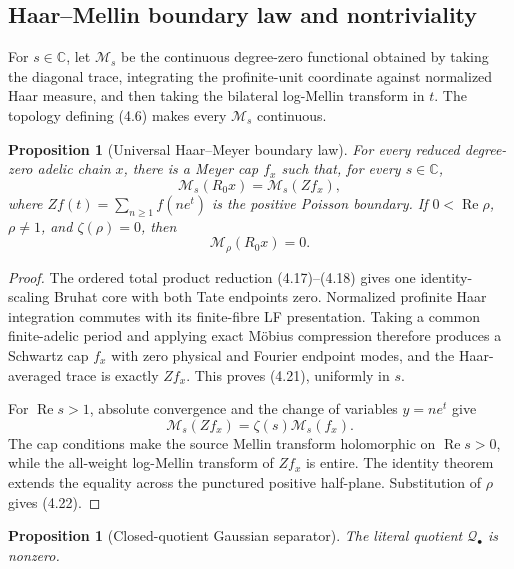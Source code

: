 \documentclass[11pt,reqno]{amsart}
\newtheorem{proposition}[theorem]{Proposition}
\newcommand{\C}{\mathbb C}
\newcommand{\re}{\operatorname{Re}}
\begin{document}
\subsection{Haar--Mellin boundary law and nontriviality}

For $s\in\C$, let $\mathcal M_s$ be the continuous degree-zero functional obtained by taking the
diagonal trace, integrating the profinite-unit coordinate against normalized Haar measure, and
then taking the bilateral log-Mellin transform in $t$.  The topology defining (4.6) makes every
$\mathcal M_s$ continuous.

\begin{proposition}[Universal Haar--Meyer boundary law]\label{prop:boundarylaw}
For every reduced degree-zero adelic chain $x$, there is a Meyer cap $f_x$ such that, for every
$s\in\C$,
\[
             \mathcal M_s(R_0x)=\mathcal M_s(Zf_x),                 \tag{4.21}
\]
where $Zf(t)=\sum_{n\ge1}f(ne^t)$ is the positive Poisson boundary.  If
$0<\re\rho$, $\rho\ne1$, and $\zeta(\rho)=0$, then
\[
                         \mathcal M_\rho(R_0x)=0.                   \tag{4.22}
\]
\end{proposition}

\begin{proof}
The ordered total product reduction (4.17)--(4.18) gives one identity-scaling Bruhat core with
both Tate endpoints zero.  Normalized profinite Haar integration commutes with its finite-fibre
LF presentation.  Taking a common finite-adelic period and applying exact Möbius compression
therefore produces a Schwartz cap $f_x$ with zero physical and Fourier endpoint modes, and the
Haar-averaged trace is exactly $Zf_x$.  This proves (4.21), uniformly in $s$.

For $\re s>1$, absolute convergence and the change of variables $y=ne^t$ give
\[
                 \mathcal M_s(Zf_x)=\zeta(s)\mathcal M_s(f_x).
\]
The cap conditions make the source Mellin transform holomorphic on $\re s>0$, while the
all-weight log-Mellin transform of $Zf_x$ is entire.  The identity theorem extends the equality
across the punctured positive half-plane.  Substitution of $\rho$ gives (4.22).
\end{proof}

\begin{proposition}[Closed-quotient Gaussian separator]\label{prop:separator}
The literal quotient $\mathcal Q_\bullet$ is nonzero.
\end{proposition}
\end{document}
